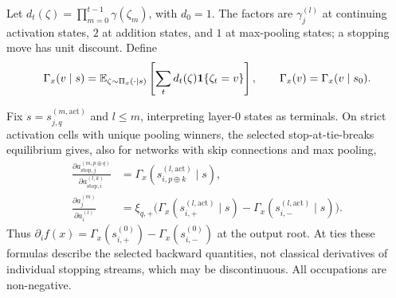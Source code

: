 \begin{definition}\label{ptnb:def:occupation}
Let $d_t(\zeta)=\prod_{m=0}^{t-1}\gamma(\zeta_m)$, with $d_0=1$.
The factors are $\gamma_j^{(l)}$ at continuing activation states, $2$ at addition states, and $1$
at max-pooling states; a stopping move has unit discount. Define
\begin{equation}\label{ptnb:eq:attribution}
    \Gamma_x(v\mid s)=\mathbb{E}_{\zeta\sim\Pi_x(\cdot\mid s)}
       \left[\sum_t d_t(\zeta)\mathbf{1}\{\zeta_t=v\}\right],
    \qquad \Gamma_x(v)=\Gamma_x(v\mid s_0).
\end{equation}
\end{definition}

\begin{theoremenv}\label{ptnb:thm:deriv-occ}\label{thm:gradient_occupation}\label{ptnb:thm:gradient}
Fix $s=s_{j,q}^{(m,\mathrm{act})}$ and $l\leq m$, interpreting layer-$0$ states as terminals.
On strict activation cells with unique pooling winners, the selected
stop-at-tie-breaks equilibrium gives, also for networks with skip connections and max pooling,
\begin{align}
 \frac{\partial a_{\mathrm{stop},j}^{(m,p\oplus q)}}
      {\partial a_{\mathrm{stop},i}^{(l,k)}}
    &=\Gamma_x(s_{i,p\oplus k}^{(l,\mathrm{act})}\mid s),\\
 \frac{\partial a_j^{(m)}}{\partial a_i^{(l)}}
    &=\xi_{q,+}\bigl(\Gamma_x(s_{i,+}^{(l,\mathrm{act})}\mid s)
                   -\Gamma_x(s_{i,-}^{(l,\mathrm{act})}\mid s)\bigr).
\end{align}
Thus $\partial_i f(x)=\Gamma_x(s_{i,+}^{(0)})-\Gamma_x(s_{i,-}^{(0)})$ at the output root.
At ties these formulas describe the selected backward quantities, not classical derivatives of
individual stopping streams, which may be discontinuous. All occupations are non-negative.
\end{theoremenv}

